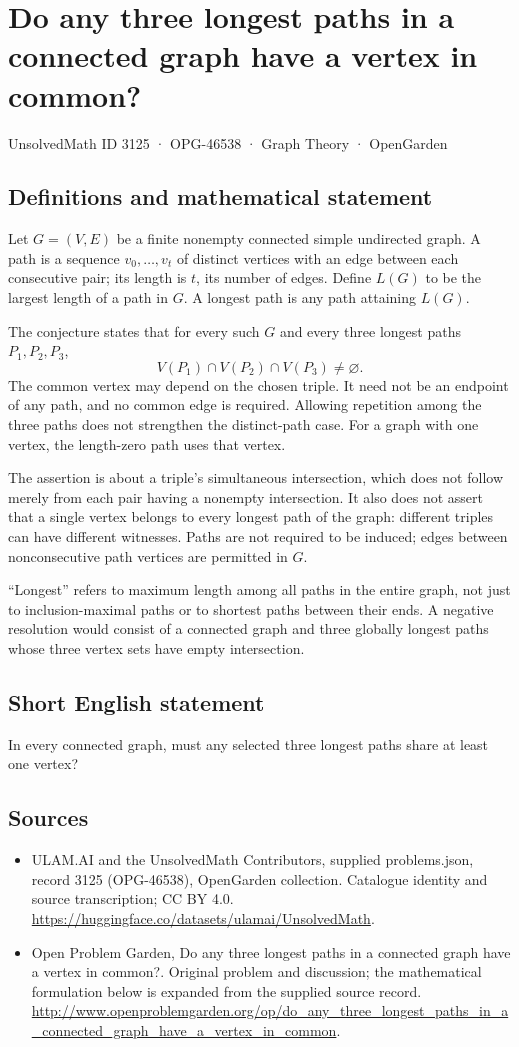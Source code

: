 \documentclass[11pt,a4paper]{article}
\begin{document}
\section*{Do any three longest paths in a connected graph have a vertex in common?}\label{3125}
{\small UnsolvedMath ID 3125 · OPG-46538 · Graph Theory · OpenGarden}
\subsection{Definitions and mathematical statement}
Let $G=(V,E)$ be a finite nonempty connected simple undirected graph.
A path is a sequence $v_0,\ldots,v_t$ of distinct vertices with an edge
between each consecutive pair; its length is $t$, its number of edges.
Define $L(G)$ to be the largest length of a path in $G$.
A longest path is any path attaining $L(G)$.

The conjecture states that for every such $G$ and every three longest
paths $P_1,P_2,P_3$,
\[
 V(P_1)\cap V(P_2)\cap V(P_3)\ne\varnothing.
\]
The common vertex may depend on the chosen triple. It need not be an
endpoint of any path, and no common edge is required. Allowing repetition
among the three paths does not strengthen the distinct-path case.
For a graph with one vertex, the length-zero path uses that vertex.

The assertion is about a triple's simultaneous intersection, which does
not follow merely from each pair having a nonempty intersection. It also
does not assert that a single vertex belongs to every longest path of
the graph: different triples can have different witnesses. Paths are
not required to be induced; edges between nonconsecutive path vertices
are permitted in $G$.

``Longest'' refers to maximum length among all paths in the entire graph,
not just to inclusion-maximal paths or to shortest paths between their
ends. A negative resolution would consist of a connected graph and
three globally longest paths whose three vertex sets have empty
intersection.
\subsection{Short English statement}
In every connected graph, must any selected three longest paths share at least one vertex?
\subsection{Sources}
\begin{itemize}
\item[S1] ULAM.AI and the UnsolvedMath Contributors, supplied problems.json, record 3125 (OPG-46538), OpenGarden collection. Catalogue identity and source transcription; CC BY 4.0.
\url{https://huggingface.co/datasets/ulamai/UnsolvedMath}.
\item[S2] Open Problem Garden, Do any three longest paths in a connected graph have a vertex in common?. Original problem and discussion; the mathematical formulation below is expanded from the supplied source record.
\url{http://www.openproblemgarden.org/op/do_any_three_longest_paths_in_a_connected_graph_have_a_vertex_in_common}.
\end{itemize}
\end{document}
